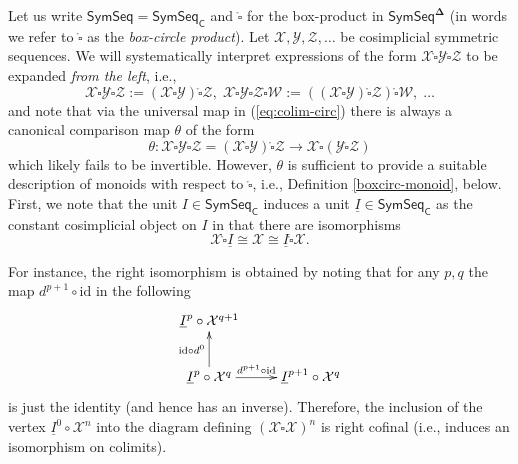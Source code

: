 \documentclass[11pt]{amsart}
\theoremstyle{definition}
\theoremstyle{remark}
\newcommand{\SymSeq}{\mathsf{SymSeq}}
\newcommand{\id}{\mathrm{id}}
\newcommand{\Cal}[1]{\mathcal{#1}}
\newcommand{\boxcirc}{\mathring{\square}}
\newcommand{\bdel}{\mathbf{\Delta}}
\begin{document}
Let us write $\SymSeq=\SymSeq_{\mathsf{C}}$ and $\boxcirc$ for the box-product in $\SymSeq^{\bdel}$ (in words we refer to $\boxcirc$ as the \textit{box-circle product}). Let $\Cal{X},\Cal{Y},\Cal{Z}, \dots$ be cosimplicial symmetric sequences. We will systematically interpret expressions of the form $\Cal{X} \boxcirc \Cal{Y} \boxcirc \Cal{Z}$ to be expanded \textit{from the left}, i.e., 
    \[\Cal{X} \boxcirc \Cal{Y} \boxcirc \Cal{Z} := (\Cal{X} \boxcirc \Cal{Y}) \boxcirc \Cal{Z}, \; \Cal{X} \boxcirc \Cal{Y} \boxcirc \Cal{Z} \boxcirc \Cal{W} := ((\Cal{X} \boxcirc \Cal{Y}) \boxcirc \Cal{Z} ) \boxcirc \Cal{W}, \;\dots \]
and note that via the universal map in (\ref{eq:colim-circ}) there is always a canonical comparison map $\theta$ of the form    
    \begin{equation} \label{eq:theta} \theta\colon  \Cal{X}\boxcirc \Cal{Y}\boxcirc \Cal{Z}=(\Cal{X} \boxcirc \Cal{Y}) \boxcirc \Cal{Z}  \to \Cal{X} \boxcirc (\Cal{Y} \boxcirc \Cal{Z})\end{equation}
which likely fails to be invertible. However, $\theta$ is sufficient to provide a suitable description of monoids with respect to $\boxcirc$, i.e., Definition \ref{boxcirc-monoid}, below. First, we note that the unit $I\in \SymSeq_{\mathsf{C}}$ induces a unit $\underline{I} \in \SymSeq_{\mathsf{C}}$ as the constant cosimplicial object on $I$ in that there are isomorphisms \[ \Cal{X} \boxcirc \underline{I} \cong \Cal{X} \cong \underline{I} \boxcirc \Cal{X}.\] 

For instance, the right isomorphism is obtained by noting that for any $p,q$ the map $d^{p+1}\circ\id$ in the following \[ \xymatrix{
        \underline{I}^p \circ \Cal{X}^{q+1} 
        & \\
        \underline{I}^p \circ \Cal{X}^q \ar[u]^-{\id\circ d^0} \ar[r]^-{d^{p+1}\circ \id}
        &
        \underline{I}^{p+1} \circ \Cal{X}^{q} 
        } \]
    is just the identity (and hence has an inverse). Therefore, the inclusion of the vertex $\underline{I}^0\circ \Cal{X}^n$ into the diagram defining $(\Cal{X}\boxcirc \Cal{X})^n$ is right cofinal (i.e., induces an isomorphism on colimits). 
    
\end{document}
